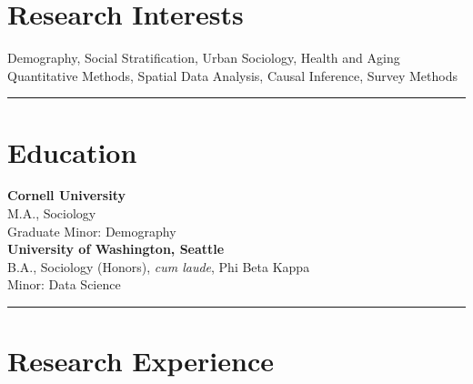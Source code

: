 \documentclass[11pt]{article} %
\begin{document}
\section*{Research Interests}

\large{} Demography, Social Stratification, Urban Sociology, Health and Aging \\
\large{} Quantitative Methods, Spatial Data Analysis, Causal Inference, Survey Methods \\
\noindent\rule{16cm}{0.4pt}

\section*{Education}
 
  \textbf{Cornell University} \\
 \textsc{M.A.}, Sociology \\
	Graduate Minor: Demography \\
	

 
 \smallskip
{} \textbf{University of Washington, Seattle} \\
\textsc{B.A.}, Sociology (Honors), \emph{cum laude}, Phi Beta Kappa \\
Minor: Data Science \\

\noindent\rule{16cm}{0.4pt}

\section*{Research Experience}
\end{document}
